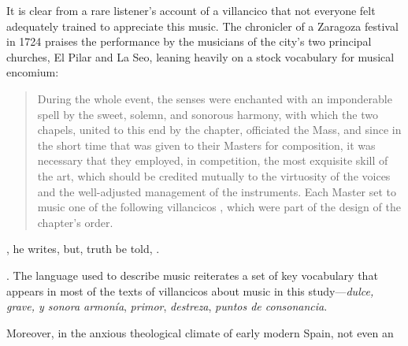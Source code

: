 It is clear from a rare listener's account of a villancico that not everyone
felt adequately trained to appreciate this music.
The chronicler of a Zaragoza festival in 1724 praises the performance by the
musicians of the city's two principal churches, El Pilar and La Seo, leaning
heavily on a stock vocabulary for musical encomium: 
\begin{quote}
    During the whole event, the senses were enchanted with an imponderable spell
    by the sweet, solemn, and sonorous harmony, with which the two chapels,
    united to this end by the chapter, officiated the Mass, and since in the
    short time that was given to their Masters for composition, it was necessary
    that they employed, in competition, the most exquisite skill
     of the art, which should be credited mutually to the
    virtuosity  of the voices and the well-adjusted management
    of the instruments.  Each Master set to music one of the following
    villancicos , which were part of the design
    of the chapter's order.
\end{quote}
, he
writes, but, truth be told, .%
\begin{Footnote}
    \Autocite
    [97: ]
    {Zaragoza1724Relacion}.
    The language used to describe music reiterates a set of key vocabulary that
    appears in most of the texts of villancicos about music in this
    study---\emph{dulce, grave, y sonora armonía}, \emph{primor},
    \emph{destreza}, \emph{puntos de consonancia}.
\end{Footnote}
Moreover, in the anxious theological climate of early modern Spain, not even an
